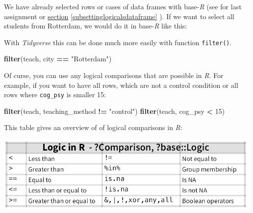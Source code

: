 \documentclass[
]{scrartcl}
\newenvironment{Shaded}{\begin{snugshade}}{\end{snugshade}}
\newcommand{\DecValTok}[1]{\textcolor[rgb]{0.00,0.00,0.81}{#1}}
\newcommand{\FunctionTok}[1]{\textcolor[rgb]{0.13,0.29,0.53}{\textbf{#1}}}
\newcommand{\NormalTok}[1]{#1}
\newcommand{\SpecialCharTok}[1]{\textcolor[rgb]{0.81,0.36,0.00}{\textbf{#1}}}
\newcommand{\StringTok}[1]{\textcolor[rgb]{0.31,0.60,0.02}{#1}}
\begin{document}
We have already selected rows or cases of data frames with base-\emph{R} (see for last assignment or \protect\hyperlink{subsettinglogicalsdataframe}{section} \ref{subsettinglogicalsdataframe} ). If we want to select all students from Rotterdam, we would do it in base-\emph{R} like this:

\begin{Shaded}
\end{Shaded}

With \emph{Tidyverse} this can be done much more easily with function \texttt{filter()}.

\begin{Shaded}
\begin{Highlighting}[]
\FunctionTok{filter}\NormalTok{(teach, city }\SpecialCharTok{==} \StringTok{"Rotterdam"}\NormalTok{)}
\end{Highlighting}
\end{Shaded}

Of curse, you can use any logical comparisons that are possible in \emph{R}. For example, if you want to have all rows, which are not a control condition or all rows where \texttt{cog\_psy} is smaller 15:

\begin{Shaded}
\begin{Highlighting}[]
\FunctionTok{filter}\NormalTok{(teach, teaching\_method }\SpecialCharTok{!=} \StringTok{"control"}\NormalTok{)}
\FunctionTok{filter}\NormalTok{(teach, cog\_psy }\SpecialCharTok{\textless{}} \DecValTok{15}\NormalTok{)}
\end{Highlighting}
\end{Shaded}

This table gives an overview of of logical comparisons in \emph{R}:

\begin{center}\includegraphics[width=500px]{images/logic_in_r} \end{center}
\end{document}
